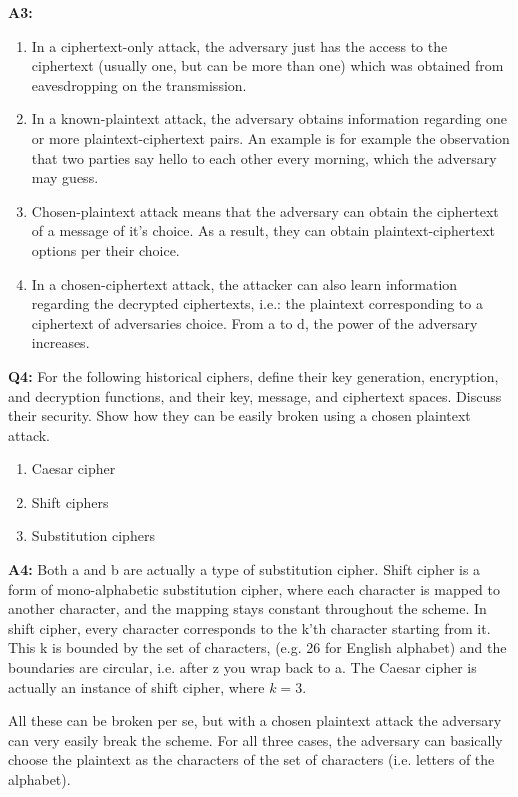 \documentclass[12pt,reqno]{amsart}
\begin{document}
\textbf{A3:}
\begin{enumerate}[label=\alph*]
\item In a ciphertext-only attack, the adversary just has the access to the ciphertext (usually one, but can be more than one) which was obtained from eavesdropping on the transmission.
\item In a known-plaintext attack, the adversary obtains information regarding one or more plaintext-ciphertext pairs. An example is for example the observation that two parties say hello to each other every morning, which the adversary may guess.
\item Chosen-plaintext attack means that the adversary can obtain the ciphertext of a message of it's choice. As a result, they can obtain plaintext-ciphertext options per their choice.
\item In a chosen-ciphertext attack, the attacker can also learn information regarding the decrypted ciphertexts, i.e.: the plaintext corresponding to a ciphertext of adversaries choice.
From a to d, the power of the adversary increases.
\end{enumerate}

\vspace{20px}
\textbf{Q4:}
For the following historical ciphers, define their key generation, encryption, and decryption functions, and their key, message, and ciphertext spaces. Discuss their security. Show how they can be easily broken using a  chosen plaintext attack.
\begin{enumerate}[label=\alph*]
\item Caesar cipher
\item Shift ciphers
\item Substitution ciphers
\end{enumerate}

\textbf{A4:}
Both a and b are actually a type of substitution cipher. Shift cipher is a form of mono-﻿﻿﻿﻿﻿﻿﻿﻿﻿﻿﻿﻿﻿﻿﻿﻿﻿﻿alphabetic substitution cipher﻿, where each character is mapped to another character, and the mapping stays constant throughout the scheme. In shift cipher, every character corresponds to the k'th character starting from it. This k is bounded by the set of characters, (e.g. 26 for English alphabet) and the boundaries are circular, i.e. after z you wrap back to a. The Caesar cipher is actually an instance of shift cipher, where $k=3$. 

All these can be broken per se, but with a chosen plaintext attack the adversary can very easily break the scheme. For all three cases, the adversary can basically choose the plaintext as the characters of the set of characters (i.e. letters of the alphabet).
\end{document}
